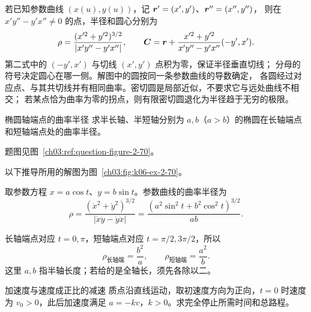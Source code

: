 {\begin{xesolution}
\FourCurvaturesDiagram
若已知参数曲线 $(x(u),y(u))$，记 $\bm{r}'=(x',y')$、$\bm{r}''=(x'',y'')$，
则在 $x'y''-y'x''\ne0$ 的点，半径和圆心分别为
\[
 \rho=\frac{(x'^2+y'^2)^{3/2}}{|x'y''-y'x''|},\qquad
 \bm{C}=\bm{r}+\frac{x'^2+y'^2}{x'y''-y'x''}(-y',x').
\]
第二式中的 $(-y',x')$ 与切线 $(x',y')$ 点积为零，保证半径垂直切线；
分母的符号决定圆心在哪一侧。解图中的圆按同一条参数曲线的导数确定，
各圆经过对应点、与其共切线并有相同曲率。密切圆是局部近似，不要求它与远处曲线不相交；
若某点恰为曲率为零的拐点，则有限密切圆退化为半径趋于无穷的极限。
\end{xesolution}

\begin{origexamplebox}{椭圆轴端点的曲率半径}\label{ch03:ex:k06-2-70}
求半长轴、半短轴分别为 $a,b$（$a>b$）的椭圆在长轴端点和短轴端点处的曲率半径。
\par 题图见图~\ref{ch03:ref:question-figure-2-70}。
\KQuestionCS
\end{origexamplebox}
\begin{xesolution}
以下推导所用的解图为图~\ref{ch03:fig:k06-ex-2-70}。

取参数方程 $x=a\cos t$、$y=b\sin t$。参数曲线的曲率半径为
\[
\rho=\frac{(\dot x^2+\dot y^2)^{3/2}}{|\dot x\ddot y-\dot y\ddot x|}
=\frac{(a^2\sin^2t+b^2\cos^2t)^{3/2}}{ab}.
\]
\EllipseCurvatureDiagram

长轴端点对应 $t=0,\pi$，短轴端点对应 $t=\pi/2,3\pi/2$，所以
\[
 \boxed{\rho_{\text{长轴端}}=\frac{b^2}{a}},\qquad
 \boxed{\rho_{\text{短轴端}}=\frac{a^2}{b}}.
\]
这里 $a,b$ 指半轴长度；若给的是全轴长，须先各除以二。
\end{xesolution}

\begin{origexamplebox}{加速度与速度成正比的减速}\label{ch03:ex:k06-2-71}
质点沿直线运动，取初速度方向为正向，$t=0$ 时速度为 $v_0>0$，此后加速度满足 $a=-kv$，$k>0$。求完全停止所需时间和总路程。


\end{origexamplebox}}
